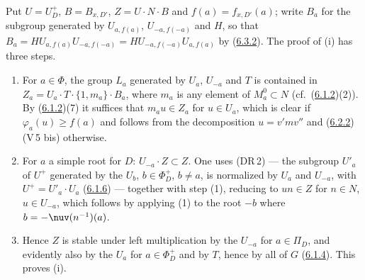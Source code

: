 \documentclass[12pt,a4paper,oneside,english]{smfart}
\newcommand{\btref}[1]{\hyperlink{bt:#1}{#1}}
\theoremstyle{definition}
\theoremstyle{bt}
\begin{document}
\begin{sketch}
Put $U=U^{+}_{D}$, $B=B_{x,D'}$, $Z=U\cdot N\cdot B$ and
$f(a)=f_{x,D'}(a)$; write $B_a$ for the subgroup generated by
$U_{a,f(a)}$, $U_{-a,f(-a)}$ and $H$, so that
$B_a=HU_{a,f(a)}U_{-a,f(-a)}=HU_{-a,f(-a)}U_{a,f(a)}$ by (\btref{6.3.2}). The
proof of (i) has three steps.
\begin{enumerate}
\item[(1)] For $a\in\Phi$, the group $L_a$ generated by $U_a$, $U_{-a}$
  and $T$ is contained in $Z_a=U_a\cdot T\cdot\{1,m_a\}\cdot B_a$, where
  $m_a$ is any element of $M^{0}_{a}\subset N$ (cf.\ (\btref{6.1.2})(2)). By
  (\btref{6.1.2})(7) it suffices that $m_a u\in Z_a$ for $u\in U_a$, which is
  clear if $\varphi_a(u)\ge f(a)$ and follows from the decomposition
  $u=v'mv''$ and (\btref{6.2.2})(V\,5 bis) otherwise.
\item[(2)] For $a$ a simple root for $D$: $U_{-a}\cdot Z\subset Z$. One
  uses (DR\,2) --- the subgroup $U'_a$ of $U^{+}$ generated by the $U_b$,
  $b\in\Phi^{+}_{D}$, $b\ne a$, is normalized by $U_a$ and $U_{-a}$, with
  $U^{+}=U'_a\cdot U_a$ (\btref{6.1.6}) --- together with step (1), reducing to
  $un\in Z$ for $n\in N$, $u\in U_{-a}$, which follows by applying (1) to
  the root $-b$ where $b=-\nuv(n^{-1})(a)$.
\item[(3)] Hence $Z$ is stable under left multiplication by the $U_{-a}$
  for $a\in\Pi_D$, and evidently also by the $U_a$ for $a\in\Phi^{+}_{D}$
  and by $T$, hence by all of $G$ (\btref{6.1.4}). This proves (i).
\end{enumerate}
\end{sketch}

\par\endgroup
\end{document}
